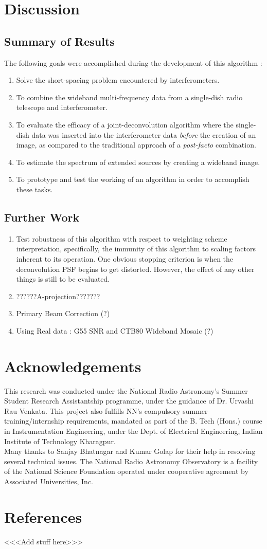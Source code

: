 \documentclass[twocolumn]{aastex61}
\begin{document}
\section{Discussion}
\subsection{Summary of Results}
The following goals were accomplished during the development of this algorithm : 
\begin{enumerate}
\item Solve the short-spacing problem encountered by interferometers.
\item To combine the wideband multi-frequency data from a single-dish radio telescope and interferometer.
\item To evaluate the efficacy of a joint-deconvolution algorithm where the single-dish data was inserted into the interferometer data \textit{before} the creation of an image, as compared to the traditional approach of a \textit{post-facto} combination.
\item To estimate the spectrum of extended sources by creating a wideband image.
\item To prototype and test the working of an algorithm in order to accomplish these tasks.
\end{enumerate}
\subsection{Further Work}
\begin{enumerate}
\item Test robustness of this algorithm with respect to weighting scheme interpretation, specifically, the immunity of this algorithm to scaling factors inherent to its operation. One obvious stopping criterion is when the deconvolution PSF begins to get distorted. However, the effect of any other things is still to be evaluated.
\item ??????A-projection???????
\item Primary Beam Correction (?)
\item Using Real data : G55 SNR and CTB80 Wideband Mosaic (?)
\end{enumerate}

\section{Acknowledgements}
This research was conducted under the National Radio Astronomy's Summer Student Research Assistantship programme, under the guidance of Dr. Urvashi Rau Venkata. This project also fulfills NN's compulsory summer training/internship requirements, mandated as part of the B. Tech (Hons.) course in Instrumentation Engineering, under the Dept. of Electrical Engineering, Indian Institute of Technology Kharagpur. \\Many thanks to Sanjay Bhatnagar and Kumar Golap for their help in resolving several technical issues.  The National Radio Astronomy Observatory is a facility of the National Science
Foundation operated under cooperative agreement by Associated Universities,
Inc. 
\section{References}
<<<Add stuff here>>>	 
\end{document}

